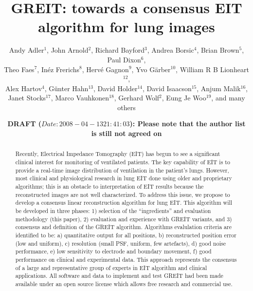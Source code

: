 \documentclass[letterpaper,twocolumn,11pt]{article}
\begin{document}
\title{\bf GREIT: towards a consensus EIT algorithm for lung images}

\author{Andy Adler$^{1}$,
        John Arnold$^{2}$,
        Richard Bayford$^{3}$,
        Andrea Borsic$^{4}$,
        Brian Brown$^{5}$,
        Paul Dixon$^{6}$,
\\
        Theo Faes$^{7}$,
        In\'ez Frerichs$^{8}$,
        Herv\'e Gagnon$^{9}$,
        Yvo G\"arber$^{10}$,
        William R B Lionheart$^{12}$,
\\
        Alex Hartov$^{4}$,
        G\"unter Hahn$^{13}$,
        David Holder$^{14}$,
        David Isaacson$^{15}$,
        Anjum Malik$^{16}$,
\\
        Janet Stocks$^{17}$,
        Marco Vauhkonen$^{18}$,
        Gerhard Wolf$^{2}$,
        Eung Je Woo$^{19}$,
        and many others%
       }

\date{\bf DRAFT ($Date: 2008-04-13 21:41:03 $): Please note that the
           author list is still not agreed on}
\maketitle



\begin{abstract}
Recently, Electrical Impedance Tomography (EIT) has begun to see a
significant clinical interest for monitoring of
ventilated patients.  The key capability of EIT is to
provide a real-time image distribution of ventilation in
the patient's lungs.
However, most clinical and physiological research in lung EIT
done using older and proprietary algorithms; this is
an obstacle to interpretation of EIT results because the
reconstructed images are not well characterized.
To address this issue, we propose to develop a 
consensus linear reconstruction algorithm for lung EIT.
This algorithm will be developed in three phases:
1) selection of the ``ingredients'' and evaluation 
methodology (this paper),
2) evaluation and experience with GREIT variants, and
3) consensus and definition of the GREIT algorithm.
Algorithms evalulation criteria are identified to be:
a) quantitative output for all positions,
b) reconstructed position error (low and uniform),
c) resolution (small PSF, uniform, few artefacts),
d) good noise performance,
e) low sensitivity to electrode and boundary movement,
f) good performance on clinical and experimental data.
This approach represents the consensus of a large and representative
group of experts in EIT algorithm and clinical applications.
All software and data to implement and test GREIT had been
made available under an open source license which allows free
research and commercial use.
\end{abstract}
\end{document}
